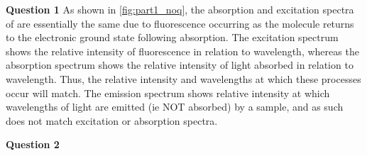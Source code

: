 



\textbf{Question 1}
As shown in \ref{fig:part1_noq}, the absorption and excitation spectra of  are essentially the same due to fluorescence occurring as the molecule returns to the electronic ground state following absorption. The excitation spectrum shows the relative intensity of fluorescence in relation to wavelength, whereas the absorption spectrum shows the relative intensity of light absorbed in relation to wavelength. Thus, the relative intensity and wavelengths at which these processes occur will match.
The emission spectrum shows relative intensity at which wavelengths of light are emitted (ie NOT absorbed) by a sample, and as such does not match excitation or absorption spectra. 

\textbf{Question 2}
